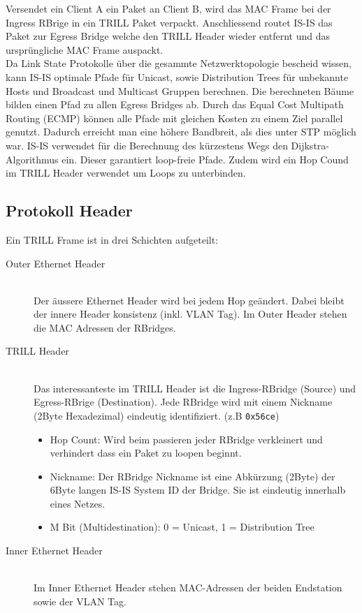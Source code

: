 Versendet ein Client A ein Paket an Client B, wird das MAC Frame bei der Ingress RBrige in ein TRILL Paket verpackt. Anschliessend routet IS-IS das Paket zur Egress Bridge welche den TRILL Header wieder entfernt und das ursprüngliche MAC Frame auspackt.  \\

Da Link State Protokolle über die gesammte Netzwerktopologie bescheid wissen, kann IS-IS optimale Pfade für Unicast, sowie Distribution Trees für unbekannte Hosts und Broadcast und Multicast Gruppen berechnen. Die berechneten Bäume bilden einen Pfad zu allen Egress Bridges ab. Durch das Equal Cost Multipath Routing (ECMP) können alle Pfade mit gleichen Kosten zu einem Ziel parallel genutzt. Dadurch erreicht man eine höhere Bandbreit, als dies unter STP möglich war. IS-IS verwendet für die Berechnung des kürzestens Wegs den Dijkstra-Algorithmus ein. Dieser garantiert loop-freie Pfade. Zudem wird ein Hop Cound im TRILL Header verwendet um Loops zu unterbinden.

\subsection{Protokoll Header}
Ein TRILL Frame ist in drei Schichten aufgeteilt:
\begin{description}
	\item[Outer Ethernet Header] \hfill \\
	Der äussere Ethernet Header wird bei jedem Hop geändert. Dabei bleibt der innere Header konsistenz (inkl. VLAN Tag). Im Outer Header stehen die MAC Adressen der RBridges.
	\item[TRILL Header] \hfill \\
	Das interessanteste im TRILL Header ist die Ingress-RBridge (Source) und Egress-RBrige (Destination). Jede RBridge wird mit einem Nickname (2Byte Hexadezimal) eindeutig identifiziert. (z.B \lstinline[]|0x56ce|) 
	\begin{itemize}
		\item Hop Count: Wird beim passieren jeder RBridge verkleinert und verhindert dass ein Paket zu loopen beginnt. 
		\item Nickname: Der RBridge Nickname ist eine Abkürzung (2Byte) der 6Byte langen IS-IS System ID der Bridge. Sie ist eindeutig innerhalb eines Netzes. 
		\item M Bit (Multidestination): 0 = Unicast, 1 = Distribution Tree
	\end{itemize}
	\item[Inner Ethernet Header] \hfill \\
	Im Inner Ethernet Header stehen MAC-Adressen der beiden Endstation sowie der VLAN Tag.
\end{description}

